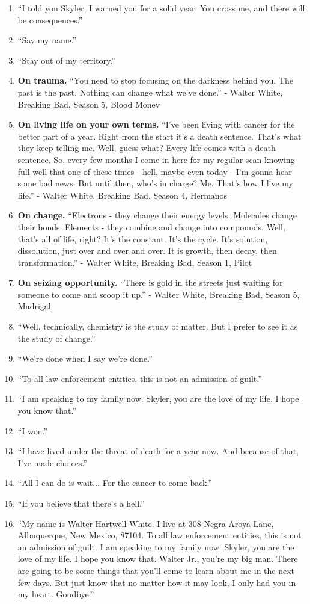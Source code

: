 \documentclass{book}
\numberwithin{equation}{section}
\begin{document}
\begin{enumerate}
    \item ``I told you Skyler, I warned you for a solid year: You cross me, and there will be consequences.''
    \item ``Say my name.''
    \item ``Stay out of my territory.''
    \item \textbf{On trauma.} ``You need to stop focusing on the darkness behind you. The past is the past. Nothing can change what we've done.'' - Walter White, Breaking Bad, Season 5, Blood Money
    \item \textbf{On living life on your own terms.} ``I've been living with cancer for the better part of a year. Right from the start it's a death sentence. That's what they keep telling me. Well, guess what? Every life comes with a death sentence. So, every few months I come in here for my regular scan knowing full well that one of these times - hell, maybe even today - I'm gonna hear some bad news. But until then, who's in charge? Me. That's how I live my life.'' - Walter White, Breaking Bad, Season 4, Hermanos
    \item \textbf{On change.} ``Electrons - they change their energy levels. Molecules change their bonds. Elements - they combine and change into compounds. Well, that's all of life, right? It's the constant. It's the cycle. It's solution, dissolution, just over and over and over. It is growth, then decay, then transformation.'' - Walter White, Breaking Bad, Season 1, Pilot
    \item \textbf{On seizing opportunity.} ``There is gold in the streets just waiting for someone to come and scoop it up.'' - Walter White, Breaking Bad, Season 5, Madrigal
    \item ``Well, technically, chemistry is the study of matter. But I prefer to see it as the study of change.''
    \item ``We're done when I say we're done.''
    \item ``To all law enforcement entities, this is not an admission of guilt.''
    \item ``I am speaking to my family now. Skyler, you are the love of my life. I hope you know that.''
    \item ``I won.''
    \item ``I have lived under the threat of death for a year now. And because of that, I've made choices.''
    \item ``All I can do is wait$\ldots$ For the cancer to come back.''
    \item ``If you believe that there's a hell.''
    \item ``My name is Walter Hartwell White. I live at 308 Negra Aroya Lane, Albuquerque, New Mexico, 87104. To all law enforcement entities, this is not an admission of guilt. I am speaking to my family now. Skyler, you are the love of my life. I hope you know that. Walter Jr., you're my big man. There are going to be some things that you'll come to learn about me in the next few days. But just know that no matter how it may look, I only had you in my heart. Goodbye.''
\end{enumerate}
\end{document}
